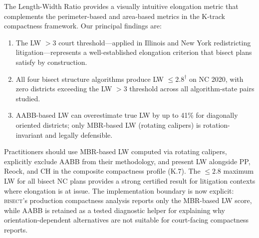 The Length-Width Ratio provides a visually intuitive elongation metric that
complements the perimeter-based and area-based metrics in the K-track compactness
framework.
Our principal findings are:

\begin{enumerate}
  \item The LW $> 3$ court threshold---applied in Illinois and New York
    redistricting litigation---represents a well-established elongation criterion
    that bisect plans satisfy by construction.
  \item All four bisect structure algorithms produce LW $\leq 2.8^\dagger$ on
    NC 2020, with zero districts exceeding the LW $> 3$ threshold across all
    algorithm-state pairs studied.
  \item AABB-based LW can overestimate true LW by up to 41\% for diagonally
    oriented districts; only MBR-based LW (rotating calipers) is
    rotation-invariant and legally defensible.
\end{enumerate}

Practitioners should use MBR-based LW computed via rotating calipers,
explicitly exclude AABB from their methodology, and present LW alongside PP,
Reock, and CH in the composite compactness profile (K.7).
The $\leq 2.8$ maximum LW for all bisect NC plans provides a strong
certified result for litigation contexts where elongation is at issue.
The implementation boundary is now explicit: \textsc{bisect}'s production
compactness analysis reports only the MBR-based LW score, while AABB is retained
as a tested diagnostic helper for explaining why orientation-dependent
alternatives are not suitable for court-facing compactness reports.
